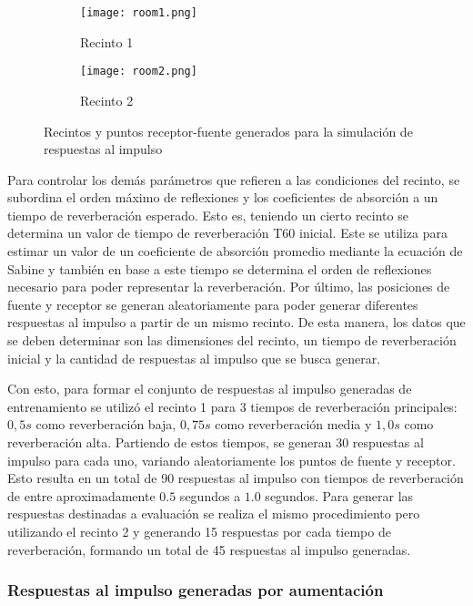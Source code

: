 \begin{figure}[H]
\centering
\begin{subfigure}{.5\textwidth}
  \centering
  \texttt{[image: room1.png]}
  \caption{Recinto 1}
  \label{fig:sub1}
\end{subfigure}%
\begin{subfigure}{.5\textwidth}
  \centering
  \texttt{[image: room2.png]}
  \caption{Recinto 2}
  \label{fig:sub2}
\end{subfigure}
\caption{Recintos y puntos receptor-fuente generados para la simulación de respuestas al impulso}
\label{fig:recintos}
\end{figure}

Para controlar los demás parámetros que refieren a las condiciones del recinto, se subordina el orden máximo de reflexiones y los coeficientes de absorción a un tiempo de reverberación esperado. Esto es, teniendo un cierto recinto se determina un valor de tiempo de reverberación T60 inicial. Este se utiliza para estimar un valor de un coeficiente de absorción promedio mediante la ecuación de Sabine y también en base a este tiempo se determina el orden de reflexiones necesario para poder representar la reverberación. 
Por último, las posiciones de fuente y receptor se generan aleatoriamente para poder generar diferentes respuestas al impulso a partir de un mismo recinto. De esta manera, los datos que se deben determinar son las dimensiones del recinto, un tiempo de reverberación inicial y la cantidad de respuestas al impulso que se busca generar. 

Con esto, para formar el conjunto de respuestas al impulso generadas de entrenamiento se utilizó el recinto 1 para 3 tiempos de reverberación principales: $0,5 s$ como reverberación baja, $0,75 s$ como reverberación media y $1,0 s$ como reverberación alta. Partiendo de estos tiempos, se generan 30 respuestas al impulso para cada uno, variando aleatoriamente los puntos de fuente y receptor. Esto resulta en un total de 90 respuestas al impulso con tiempos de reverberación de entre aproximadamente $0.5$ segundos a $1.0$ segundos. Para generar las respuestas destinadas a evaluación se realiza el mismo procedimiento pero utilizando el recinto 2 y generando 15 respuestas por cada tiempo de reverberación, formando un total de 45 respuestas al impulso generadas. 

\subsubsection{Respuestas al impulso generadas por aumentación}

